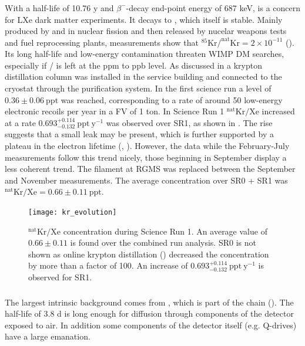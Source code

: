 \subsubsection{}
\label{subsubsec:backgrounds_electronic_krypton}
With a half-life of 10.76 y and $\beta^-$-decay end-point energy of 687 keV,  is a concern for LXe dark matter
experiments.  It decays to , which itself is stable.  Mainly
produced by  and  in nuclear fission and then released by nucelar weapons tests and fuel reprocessing plants,
measurements show that $\mathrm{^{85}Kr / ^{nat}Kr} = 2 \times 10^{-11}$ ().  Its long half-life and low-energy
contamination threaten WIMP DM searches, especially if / is left at the ppm to ppb level.  As discussed in
 a krypton distillation column was installed in the service building and connected to the cryostat through
the purification system.  In the first science run a level of $0.36 \pm 0.06\ \mathrm{ppt}$ was reached, corresponding to a rate of
around 50 low-energy electronic recoils per year in a FV of 1 ton.  In Science Run 1 $\mathrm{^{nat}Kr / Xe}$ increased at a rate
$0.693_{-0.132}^{+0.114}\ \mathrm{ppt\ y^{-1}}$ was observed over SR1, as shown in
.  The rise suggests that a small leak may be present, which is further supported
by a plateau in the electron lifetime (, ).  However, the data while the February-July
measurements follow this trend nicely, those beginning in September display a less coherent trend.  The filament at RGMS was replaced
between the September and November measurements.  The average concentration over SR0 + SR1 was
$^{\mathrm{nat}}\mathrm{Kr}/\mathrm{Xe} = 0.66 \pm 0.11\ \mathrm{ppt}$.

\begin{figure}
\centering
\texttt{[image: kr\_evolution]}
\caption{$\mathrm{^{nat}Kr / Xe}$ concentration during Science Run 1.  An average value of $0.66 \pm 0.11$ is found over the combined
run analysis.  SR0 is not shown as online krypton distillation () decreased the concentration by more than
a factor of 100.  An increase of $0.693_{-0.132}^{+0.114}\ \mathrm{ppt\ y^{-1}}$ is observed for SR1.}
\label{fig:backgrounds_electronic_krypton_rate_increase}
\end{figure}

\subsubsection{}
\label{subsubsec:backgrounds_electronic_radon}
The largest intrinsic background comes from , which is part of the  chain
().  The half-life of 3.8 d is long enough for diffusion through components of the detector exposed
to air.  In addition some components of the detector itself (e.g. Q-drives) have a large  emanation.

